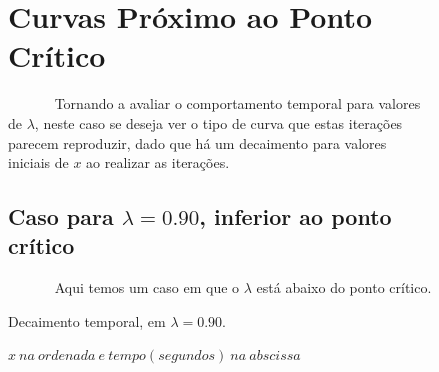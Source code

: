 \documentclass[pdftex,12pt,a4paper]{article}
\begin{document}
\begin{figure}
\section{Curvas Próximo ao Ponto Crítico}
~~~~~~ Tornando a avaliar o comportamento temporal para valores de $\lambda$, neste caso se deseja ver o tipo de curva que estas iterações parecem reproduzir, dado que há um decaimento para valores iniciais de $x$ ao realizar as iterações.

\subsection{Caso para $\lambda = 0.90$, inferior ao ponto crítico}
~~~~~~ Aqui temos um caso em que o $\lambda$ está abaixo do ponto crítico.

\centering
\caption{Decaimento temporal, em $\lambda = 0.90$.}
\caption*{$x\ na\ ordenada\ e\ tempo(segundos)\ na\ abscissa$}
\end{figure}
\end{document}
